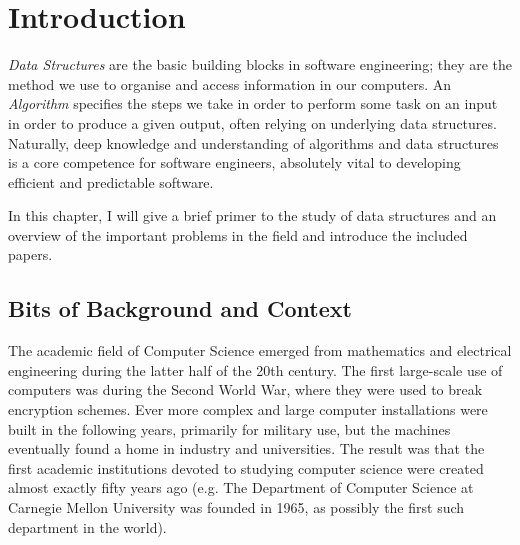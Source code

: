 \chapter{Introduction}
\emph{Data Structures} are the basic building blocks in software engineering; they are the method we use to organise and access information in our computers. An \emph{Algorithm} specifies the steps we take in order to perform some task on an input in order to produce a given output, often relying on underlying data structures. Naturally, deep knowledge and understanding of algorithms and data structures is a core competence for software engineers, absolutely vital to developing efficient and predictable software.


In this chapter, I will give a brief primer to the study of data structures and an overview of the important problems in the field and introduce the included papers.

\section{Bits of Background and Context}
The academic field of Computer Science emerged from mathematics and electrical engineering during the latter half of the 20th century. 
The first large-scale use of computers was during the Second World War, where they were used to break encryption schemes. Ever more complex and large computer installations were built in the following years, primarily for military use, but the machines eventually found a home in industry and universities. 
The result was that the first academic institutions devoted to studying computer science were created almost exactly fifty years ago (e.g. The Department of Computer Science at Carnegie Mellon University was founded in 1965, as possibly the first such department in the world).

